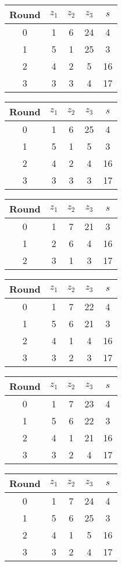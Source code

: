 \begin{multicols}{2}
\begin{tabular}{c | c | c | c | c }
Round & $z_1$ & $z_2$ & $z_3$ & $s$ \\
\hline
0 & 1 & 6 & 24 & 4 \\
1 & 5 & 1 & 25 & 3 \\
2 & 4 & 2 & 5 & 16 \\
3 & 3 & 3 & 4 & 17
\end{tabular}


\begin{tabular}{c | c | c | c | c }
Round & $z_1$ & $z_2$ & $z_3$ & $s$ \\
\hline
0 & 1 & 6 & 25 & 4 \\
1 & 5 & 1 & 5 & 3 \\
2 & 4 & 2 & 4 & 16 \\
3 & 3 & 3 & 3 & 17
\end{tabular}


\begin{tabular}{c | c | c | c | c }
Round & $z_1$ & $z_2$ & $z_3$ & $s$ \\
\hline
0 & 1 & 7 & 21 & 3 \\
1 & 2 & 6 & 4 & 16 \\
2 & 3 & 1 & 3 & 17
\end{tabular}


\begin{tabular}{c | c | c | c | c }
Round & $z_1$ & $z_2$ & $z_3$ & $s$ \\
\hline
0 & 1 & 7 & 22 & 4 \\
1 & 5 & 6 & 21 & 3 \\
2 & 4 & 1 & 4 & 16 \\
3 & 3 & 2 & 3 & 17
\end{tabular}


\begin{tabular}{c | c | c | c | c }
Round & $z_1$ & $z_2$ & $z_3$ & $s$ \\
\hline
0 & 1 & 7 & 23 & 4 \\
1 & 5 & 6 & 22 & 3 \\
2 & 4 & 1 & 21 & 16 \\
3 & 3 & 2 & 4 & 17
\end{tabular}


\begin{tabular}{c | c | c | c | c }
Round & $z_1$ & $z_2$ & $z_3$ & $s$ \\
\hline
0 & 1 & 7 & 24 & 4 \\
1 & 5 & 6 & 25 & 3 \\
2 & 4 & 1 & 5 & 16 \\
3 & 3 & 2 & 4 & 17
\end{tabular}



\end{multicols}

